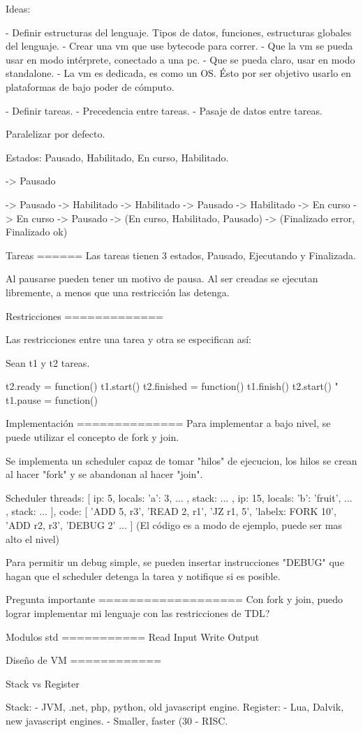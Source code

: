 
Ideas:

 - Definir estructuras del lenguaje. Tipos de datos, funciones, estructuras globales del lenguaje.
 - Crear una vm que use bytecode para correr.
 - Que la vm se pueda usar en modo intérprete, conectado a una pc.
 - Que se pueda claro, usar en modo standalone.
 - La vm es dedicada, es como un OS. Ésto por ser objetivo usarlo en plataformas de bajo poder de cómputo.


- Definir tareas.
- Precedencia entre tareas.
- Pasaje de datos entre tareas.

Paralelizar por defecto.

Estados:
Pausado, Habilitado, En curso, Habilitado.

-> Pausado

-> Pausado -> Habilitado
-> Habilitado -> Pausado
-> Habilitado -> En curso
-> En curso -> Pausado
-> (En curso, Habilitado, Pausado) -> (Finalizado error, Finalizado ok)

Tareas
======
Las tareas tienen 3 estados, Pausado, Ejecutando y Finalizada.

Al pausarse pueden tener un motivo de pausa.
Al ser creadas se ejecutan libremente, a menos que una restricción
las detenga.

Restricciones
=============

Las restricciones entre una tarea y otra se especifican así:

Sean t1 y t2 tareas.

t2.ready = function() { t1.start() }
t2.finished = function() { t1.finish() }
t2.start()
"
t1.pause = function() {}

Implementación
==============
Para implementar a bajo nivel, se puede utilizar el concepto de fork y join.

Se implementa un scheduler capaz de tomar "hilos" de ejecucion,
los hilos se crean al hacer "fork" y se abandonan al hacer "join".

Scheduler {
  threads: [
    {ip: 5, locals: { 'a': 3, ... }, stack: { ... }},
    {ip: 15, locals: { 'b': 'fruit', ... }, stack: { ... }}
  ],
  code: [
    'ADD 5, r3',
    'READ 2, r1',
    'JZ r1, 5',
    'labelx: FORK 10',
    'ADD r2, r3',
    'DEBUG 2'
    ...
  ]
}
(El código es a modo de ejemplo, puede ser mas alto el nivel)

Para permitir un debug simple, se pueden insertar instrucciones "DEBUG" que hagan que el scheduler detenga la tarea y notifique si es posible.


Pregunta importante
===================
Con fork y join, puedo lograr implementar mi lenguaje con las restricciones de TDL?


Modulos std
===========
Read Input
Write Output

Diseño de VM
============

Stack vs Register

Stack:
 - JVM, .net, php, python, old javascript engine.
Register:
 - Lua, Dalvik, new javascript engines.
 - Smaller, faster (30%
 - RISC.
